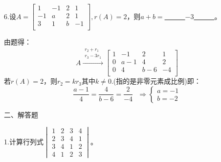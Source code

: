 \documentclass{article}
\begin{document}
6.设$A=
\begin{bmatrix}
  1 & -1 & 2 & 1\\
  -1 & a & 2 & 1\\
  3 & 1 & b & -1\\
\end{bmatrix},r(A)=2
$，则$a+b=$\underline{~~~~~~$-3$~~~~~~}。

\begin{jie}
由题得：
\begin{equation*}
  A\xrightarrow{\substack{r_{2}+r_{1} \\ r_{3}-3r_{1}}}
{
    \begin{bmatrix}
  1 & -1 & 2 & 1\\
  0 & a-1 & 4 & 2\\
  0 & 4 & b-6 & -4\\
\end{bmatrix}
}
\end{equation*}
若$r(A)=2$，则$r_{2}=kr_{3}$其中$k\neq0$.(指的是非零元素成比例)即：
\begin{equation*}
  \frac{a-1}{4}=\frac{4}{b-6}=\frac{2}{-4}~~~\Rightarrow
  \begin{cases}
    a=-1\\ b=-2
  \end{cases}
\end{equation*}
\end{jie}

二、解答题

1.计算行列式$
\begin{vmatrix}
  1 & 2 & 3 & 4 \\
  2 & 3 & 4& 1 \\
  3 & 4 & 1& 2\\
   4 & 1 &2 &3
\end{vmatrix}
$。
\end{document}
